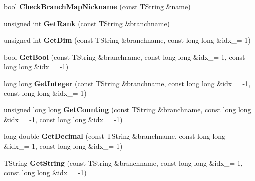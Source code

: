 \begin{DoxyCompactItemize}
\item 
\hypertarget{class_h_a_l_1_1_analysis_tree_reader_afa371719adcfa583fe29ea0f468b9ea8}{bool {\bfseries Check\+Branch\+Map\+Nickname} (const T\+String \&name)}\label{class_h_a_l_1_1_analysis_tree_reader_afa371719adcfa583fe29ea0f468b9ea8}

\item 
\hypertarget{class_h_a_l_1_1_analysis_tree_reader_aa4dae5db1c660155760ded68007cdd6d}{unsigned int {\bfseries Get\+Rank} (const T\+String \&branchname)}\label{class_h_a_l_1_1_analysis_tree_reader_aa4dae5db1c660155760ded68007cdd6d}

\item 
\hypertarget{class_h_a_l_1_1_analysis_tree_reader_a1a8c741c6b2ae788b98d596c12543724}{unsigned int {\bfseries Get\+Dim} (const T\+String \&branchname, const long long \&idx\+\_=-\/1)}\label{class_h_a_l_1_1_analysis_tree_reader_a1a8c741c6b2ae788b98d596c12543724}

\item 
\hypertarget{class_h_a_l_1_1_analysis_tree_reader_a8a76466f4746d4764b0fa97416182267}{bool {\bfseries Get\+Bool} (const T\+String \&branchname, const long long \&idx\+\_=-\/1, const long long \&idx\+\_=-\/1)}\label{class_h_a_l_1_1_analysis_tree_reader_a8a76466f4746d4764b0fa97416182267}

\item 
\hypertarget{class_h_a_l_1_1_analysis_tree_reader_a6b2e01f1075ed295513a268258d3d559}{long long {\bfseries Get\+Integer} (const T\+String \&branchname, const long long \&idx\+\_=-\/1, const long long \&idx\+\_=-\/1)}\label{class_h_a_l_1_1_analysis_tree_reader_a6b2e01f1075ed295513a268258d3d559}

\item 
\hypertarget{class_h_a_l_1_1_analysis_tree_reader_aa4d264484021ba0912f6254aeacc784f}{unsigned long long {\bfseries Get\+Counting} (const T\+String \&branchname, const long long \&idx\+\_=-\/1, const long long \&idx\+\_=-\/1)}\label{class_h_a_l_1_1_analysis_tree_reader_aa4d264484021ba0912f6254aeacc784f}

\item 
\hypertarget{class_h_a_l_1_1_analysis_tree_reader_a4a3dd2065768228ab817575307c4691e}{long double {\bfseries Get\+Decimal} (const T\+String \&branchname, const long long \&idx\+\_=-\/1, const long long \&idx\+\_=-\/1)}\label{class_h_a_l_1_1_analysis_tree_reader_a4a3dd2065768228ab817575307c4691e}

\item 
\hypertarget{class_h_a_l_1_1_analysis_tree_reader_a75c0fe7d907ac8f1792ff496e4cf0b73}{T\+String {\bfseries Get\+String} (const T\+String \&branchname, const long long \&idx\+\_=-\/1, const long long \&idx\+\_=-\/1)}\label{class_h_a_l_1_1_analysis_tree_reader_a75c0fe7d907ac8f1792ff496e4cf0b73}


\end{DoxyCompactItemize}
